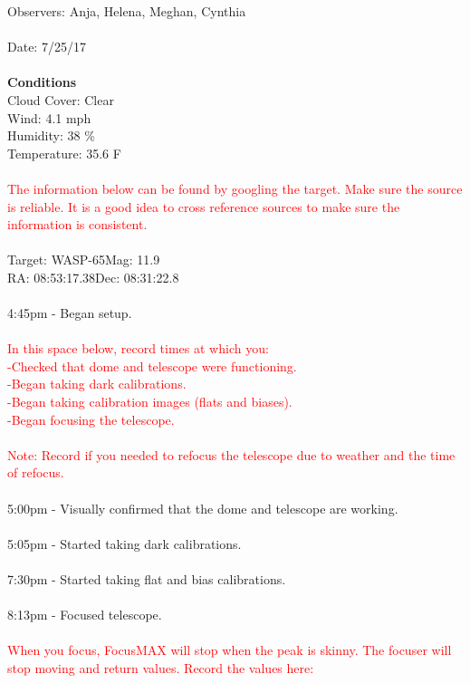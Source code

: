 \documentclass[11pt]{report}
\begin{document}
Observers: Anja, Helena, Meghan, Cynthia \\ \\
Date: 7/25/17 \\ \\
{\bf Conditions \\}
Cloud Cover: Clear \\
Wind: 4.1 mph \\
Humidity: 38 \% \\
Temperature: 35.6 F \\ \\
\textcolor{red}{The information below can be found by googling the target. Make sure the source is reliable. It is a good idea to cross reference sources to make sure the information is consistent.} \\ \\
Target: WASP-65\hspace{75pt}Mag: 11.9 \\
RA: 08:53:17.38\hspace{85pt}Dec: 08:31:22.8 \\ \\
4:45pm - Began setup. \\ \\
\textcolor{red}{In this space below, record times at which you: \\
-Checked that dome and telescope were functioning. \\
-Began taking dark calibrations. \\
-Began taking calibration images (flats and biases). \\
-Began focusing the telescope. \\ \\
Note: Record if you needed to refocus the telescope due to weather and the time of refocus.} \\ \\
5:00pm - Visually confirmed that the dome and telescope are working. \\ \\
5:05pm - Started taking dark calibrations. \\ \\
7:30pm - Started taking flat and bias calibrations. \\ \\ 
8:13pm - Focused telescope. \\ \\
\textcolor{red}{When you focus, FocusMAX will stop when the peak is skinny. The focuser will stop moving and return values. Record the values here:} \\  \\
\end{document}
